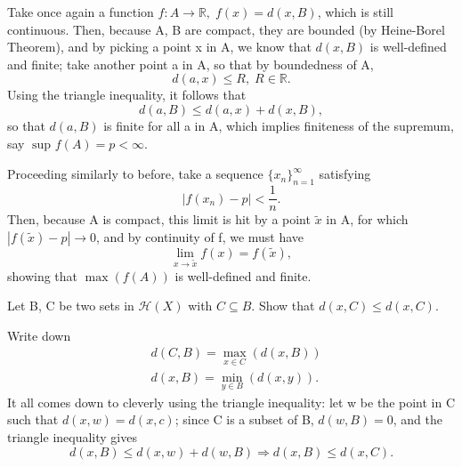 \documentclass[../fractals_everywhere.tex]{subfiles}
\begin{document}
Take once again a function \(f:A\rightarrow \mathbb{R},\; f(x) = d(x, B)\), which is still continuous. Then, because A, B are compact, they are bounded (by Heine-Borel Theorem), and by picking a point x in A, we know that \(d(x, B)\) is well-defined and finite; take another point a in A, so that by boundedness of A,
\[
	d(a, x)\leq R,\; R\in \mathbb{R}.
\]
Using the triangle inequality, it follows that
\[
	d(a, B) \leq d(a, x) + d(x, B),
\]
so that \(d(a, B)\) is finite for all a in A, which implies finiteness of the supremum, say \(\sup_{}f(A) = p < \infty\).

Proceeding similarly to before, take a sequence \(\{x_{n}\}_{n=1}^{\infty}\) satisfying
\[
	| f(x_{n}) - p | < \frac{1}{n}.
\]
Then, because A is compact, this limit is hit by a point \(\tilde{x}\) in A, for which \linebreak \(| f(\tilde{x}) - p |\to 0\), and by continuity of f, we must have
\[
	\lim_{x\to \tilde{x}}f(x) = f(\tilde{x}),
\]
showing that \(\max\limits_{}(f(A))\) is well-defined and finite.

\begin{exr}
	Let B, C be two sets in \(\mathcal{H}(X)\) with \(C\subseteq B\). Show that \(d(x, C)\leq d(x, C)\).

	Write down
	\begin{align*}
		 & d(C, B) = \max\limits_{x\in C}(d(x, B))  \\
		 & d(x, B) = \min\limits_{y\in B}(d(x, y)).
	\end{align*}
	It all comes down to cleverly using the triangle inequality: let w be the point in C such that \(d(x, w) = d(x, c)\); since C is a subset of B, \(d(w, B) = 0\), and the triangle inequality gives
	\[
		d(x, B) \leq d(x, w) + d(w, B) \Rightarrow d(x, B)\leq d(x, C).
	\]
\end{exr}
\end{document}
